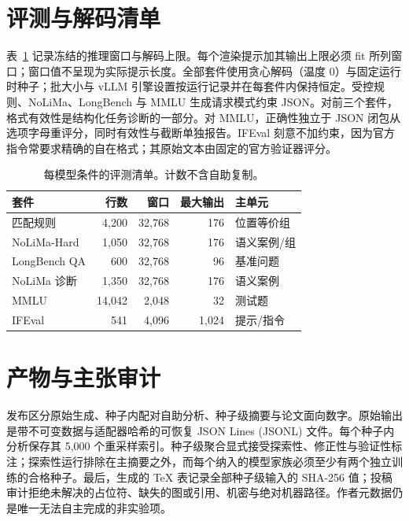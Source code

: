 \documentclass[11pt]{article}
\begin{document}
\section{评测与解码清单}

表~\ref{tab:evaluation-config} 记录冻结的推理窗口与解码上限。每个渲染提示加其输出上限必须 fit 所列窗口；窗口值不呈现为实际提示长度。全部套件使用贪心解码（温度 0）与固定运行时种子；批大小与 vLLM 引擎设置按运行记录并在每套件内保持恒定。受控规则、NoLiMa、LongBench 与 MMLU 生成请求模式约束 JSON。对前三个套件，格式有效性是结构化任务诊断的一部分。对 MMLU，正确性独立于 JSON 闭包从选项字母重评分，同时有效性与截断单独报告。IFEval 刻意不加约束，因为官方指令常要求精确的自在格式；其原始文本由固定的官方验证器评分。

\begin{table}[h]
\centering
\small
\caption{每模型条件的评测清单。计数不含自助复制。}
\label{tab:evaluation-config}
\begin{tabular}{lrrrl}
\toprule
套件 & 行数 & 窗口 & 最大输出 & 主单元 \\
\midrule
匹配规则 & 4,200 & 32,768 & 176 & 位置等价组 \\
NoLiMa-Hard & 1,050 & 32,768 & 176 & 语义案例/组 \\
LongBench QA & 600 & 32,768 & 96 & 基准问题 \\
NoLiMa 诊断 & 1,350 & 32,768 & 176 & 语义案例 \\
MMLU & 14,042 & 2,048 & 32 & 测试题 \\
IFEval & 541 & 4,096 & 1,024 & 提示/指令 \\
\bottomrule
\end{tabular}
\end{table}

\section{产物与主张审计}

发布区分原始生成、种子内配对自助分析、种子级摘要与论文面向数字。原始输出是带不可变数据与适配器哈希的可恢复 JSON Lines (JSONL) 文件。每个种子内分析保存其 5,000 个重采样索引。种子级聚合显式接受探索性、修正性与验证性标注；探索性运行排除在主摘要之外，而每个纳入的模型家族必须至少有两个独立训练的合格种子。最后，生成的 TeX 表记录全部种子级输入的 SHA-256 值；投稿审计拒绝未解决的占位符、缺失的图或引用、机密与绝对机器路径。作者元数据仍是唯一无法自主完成的非实验项。



\end{document}
